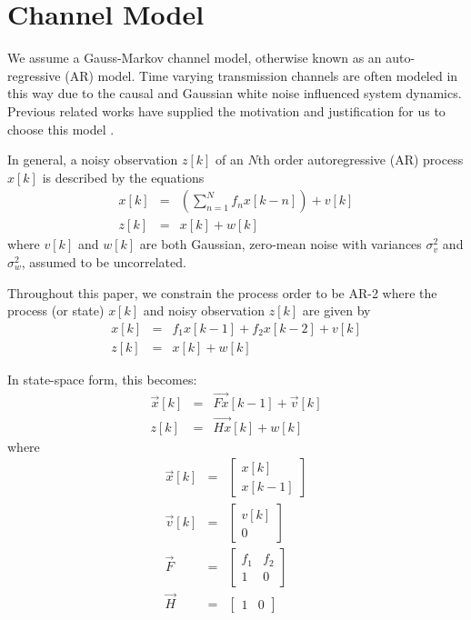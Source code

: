 \documentclass[twocolumn,letterpaper]{IEEEAerospaceCLS}  %
\begin{document}
\section{Channel Model}
\label{sec:channelmodel}

We assume a Gauss-Markov channel model, otherwise known as 
an %
auto-regressive (AR) model. Time varying transmission channels are often modeled in this way due to the causal and Gaussian white noise influenced system dynamics. Previous related works have supplied the motivation and justification for us to choose this model \cite{181202986} \cite{baddour2001autoregressive} \cite{wen2008autoregressive}.

In general, a noisy observation $z[k]$ of an $N$th order autoregressive (AR) process $x[k]$ is described by the equations
\begin{eqnarray}
x[k]&=&\left(\sum_{n=1}^N f_{n}x[k-n]\right) + v[k]\\
z[k]&=&x[k] + w[k]
\end{eqnarray}
where $v[k]$ and $w[k]$ are both Gaussian, zero-mean noise with variances $\sigma_v^2$ and $\sigma_w^2$, assumed to be uncorrelated.

Throughout this paper, we constrain the process order to be AR-2 where the process (or state) $x[k]$ and noisy observation $z[k]$ are given by
\begin{eqnarray}
x[k]&=&f_1x[k-1]+ f_2x[k-2] + v[k]\\
z[k]&=&x[k] + w[k]
\end{eqnarray}

In state-space form, this becomes:
\begin{eqnarray}
\vec{x}[k]&=&\vec{Fx}[k-1]+\vec{v}[k]\\
z[k]&=&\vec{Hx}[k]+w[k]
\end{eqnarray}
where
\begin{eqnarray*}
\vec{x}[k]&=&\begin{bmatrix}
    x[k]\\ x[k-1]
\end{bmatrix}\\
\vec{v}[k]&=&\begin{bmatrix}
    v[k]\\ 0
\end{bmatrix}\\
\vec{F}&=&\begin{bmatrix}
    f_1       & f_2 \\
    1       & 0 
\end{bmatrix}\\
\vec{H}&=&\begin{bmatrix}
    1       & 0 
\end{bmatrix}
\end{eqnarray*}
\end{document}
